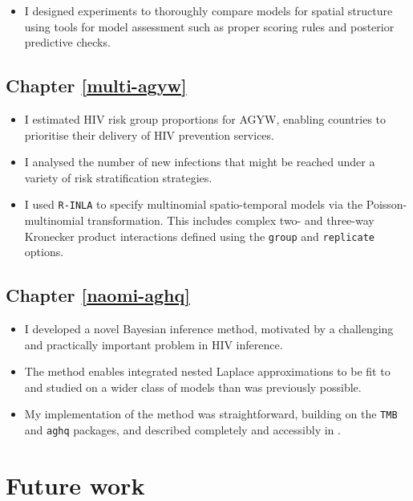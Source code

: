 \documentclass[a4paper, nobind]{templates/ociamthesis}
\providecommand{\tightlist}{%
  \setlength{\itemsep}{0pt}\setlength{\parskip}{0pt}}
\begin{document}
\begin{itemize}
\tightlist
\item
  I designed experiments to thoroughly compare models for spatial structure using tools for model assessment such as proper scoring rules and posterior predictive checks.
\end{itemize}

\hypertarget{chapter-refmulti-agyw}{%
\subsection{Chapter \ref{multi-agyw}}\label{chapter-refmulti-agyw}}

\begin{itemize}
\tightlist
\item
  I estimated HIV risk group proportions for AGYW, enabling countries to prioritise their delivery of HIV prevention services.
\item
  I analysed the number of new infections that might be reached under a variety of risk stratification strategies.
\item
  I used \texttt{R-INLA} to specify multinomial spatio-temporal models via the Poisson-multinomial transformation. This includes complex two- and three-way Kronecker product interactions defined using the \texttt{group} and \texttt{replicate} options.
\end{itemize}

\hypertarget{chapter-refnaomi-aghq}{%
\subsection{Chapter \ref{naomi-aghq}}\label{chapter-refnaomi-aghq}}

\begin{itemize}
\tightlist
\item
  I developed a novel Bayesian inference method, motivated by a challenging and practically important problem in HIV inference.
\item
  The method enables integrated nested Laplace approximations to be fit to and studied on a wider class of models than was previously possible.
\item
  My implementation of the method was straightforward, building on the \texttt{TMB} and \texttt{aghq} packages, and described completely and accessibly in \textcite{howes2023fast}.
\end{itemize}

\hypertarget{future-work}{%
\section{Future work}\label{future-work}}
\end{document}
